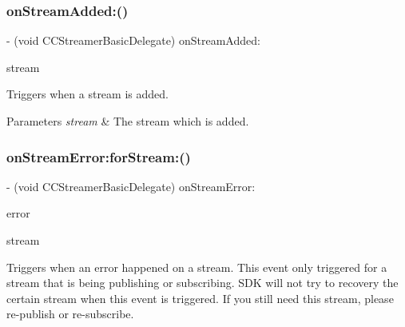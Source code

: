 \subsubsection{\texorpdfstring{on\+Stream\+Added\+:()}{onStreamAdded:()}}
{\footnotesize\ttfamily -\/ (void C\+C\+Streamer\+Basic\+Delegate) on\+Stream\+Added\+: \begin{DoxyParamCaption}\item[{(\hyperlink{interface_c_c_stream}{C\+C\+Stream} $\ast$)}]{stream }\end{DoxyParamCaption}\hspace{0.3cm}{\ttfamily [optional]}}



Triggers when a stream is added. 


\begin{DoxyParams}{Parameters}
{\em stream} & The stream which is added. \\
\hline
\end{DoxyParams}
\mbox{\label{protocol_c_c_streamer_basic_delegate_01-p_aba1d5bd136512679ef362d976a3f30fc}} 
\subsubsection{\texorpdfstring{on\+Stream\+Error\+:for\+Stream\+:()}{onStreamError:forStream:()}}
{\footnotesize\ttfamily -\/ (void C\+C\+Streamer\+Basic\+Delegate) on\+Stream\+Error\+: \begin{DoxyParamCaption}\item[{(N\+S\+Error $\ast$)}]{error }\item[{forStream:(\hyperlink{interface_c_c_stream}{C\+C\+Stream} $\ast$)}]{stream }\end{DoxyParamCaption}\hspace{0.3cm}{\ttfamily [optional]}}



Triggers when an error happened on a stream.  This event only triggered for a stream that is being publishing or subscribing. S\+DK will not try to recovery the certain stream when this event is triggered. If you still need this stream, please re-\/publish or re-\/subscribe. 


